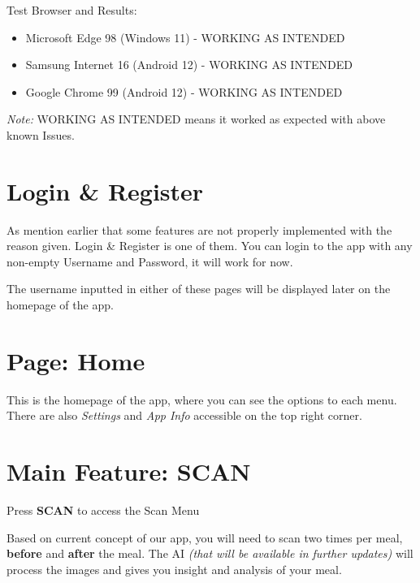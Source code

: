 \documentclass[a4paper,12pt]{article}
\begin{document}
\noindent
Test Browser and Results:
\begin{itemize}
    \item Microsoft Edge 98 (Windows 11) - WORKING AS INTENDED
    \item Samsung Internet 16 (Android 12) - WORKING AS INTENDED
    \item Google Chrome 99  (Android 12) - WORKING AS INTENDED
\end{itemize}

\noindent
\textit{Note:} WORKING AS INTENDED means it worked as expected with above known Issues.

\section{Login \& Register}


As mention earlier that some features are not properly implemented with the reason given.
Login \& Register is one of them. You can login to the app with any non-empty Username and
Password, it will work for now.

The username inputted in either of these pages will be displayed later on
the homepage of the app.

\pagebreak
\section{Page: Home}


This is the homepage of the app, where you can see the options to each menu.
There are also \textit{Settings} and \textit{App Info} accessible on the top right corner.

\pagebreak
\section{Main Feature: SCAN}

Press \textbf{SCAN} to access the Scan Menu


Based on current concept of our app, you will need to scan two times per meal,
\textbf{before} and \textbf{after} the meal.
The AI \textit{(that will be available in further updates)} will process
the images and gives you insight and analysis of your meal.
\end{document}
